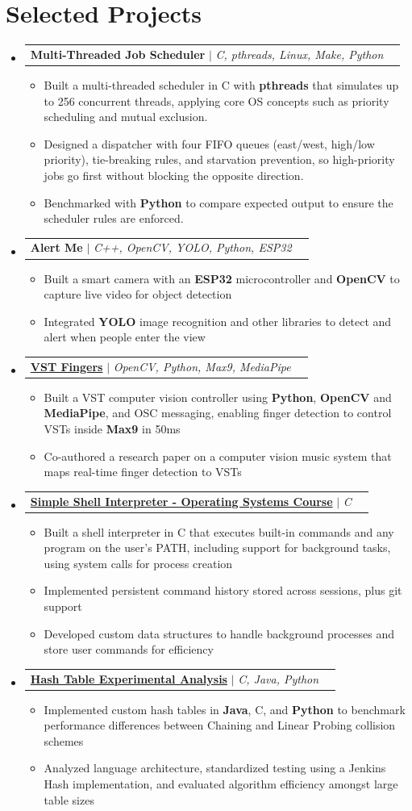 \documentclass[letterpaper,10pt]{article}
\makeatletter
\newcommand{\resumeItem}[1]{
  \item\small{
    {#1 \vspace{-1pt}}
  }
}
\newcommand{\resumeProjectHeading}[2]{
    \item
    \begin{tabularx}{0.97\textwidth}{@{}Xr@{}}
      \small#1 & #2 \\
    \end{tabularx}\vspace{-6pt}
}
\newcommand{\resumeSubHeadingListStart}{\begin{itemize}[leftmargin=0.15in, label={}]}
\newcommand{\resumeSubHeadingListEnd}{\end{itemize}}
\newcommand{\resumeItemListStart}{\begin{itemize}[label=$\bullet$, itemsep=1.80pt, topsep=0pt, parsep=0pt]}
\newcommand{\resumeItemListEnd}{\end{itemize}\vspace{-2pt}}
\makeatother
\begin{document}
\section{Selected Projects}
\resumeSubHeadingListStart
\resumeProjectHeading{\textbf{Multi-Threaded Job Scheduler} $|$ \emph{C, pthreads, Linux, Make, Python}}{}
\resumeItemListStart
  \resumeItem{Built a multi-threaded scheduler in C with \textbf{pthreads} that simulates up to 256 concurrent threads, applying core OS concepts such as priority scheduling and mutual exclusion.}
  \resumeItem{Designed a dispatcher with four FIFO queues (east/west, high/low priority), tie-breaking rules, and starvation prevention, so high-priority jobs go first without blocking the opposite direction.}
  \resumeItem{Benchmarked with \textbf{Python} to compare expected output to ensure the scheduler rules are enforced.}
\resumeItemListEnd
\resumeProjectHeading{\textbf{Alert Me} $|$ \emph{C++, OpenCV, YOLO, Python, ESP32}}{}
\resumeItemListStart
  \resumeItem{Built a smart camera with an \textbf{ESP32} microcontroller and \textbf{OpenCV} to capture live video for object detection}
  \resumeItem{Integrated \textbf{YOLO} image recognition and other libraries to detect and alert when people enter the view}
\resumeItemListEnd
\resumeProjectHeading{\href{https://github.com/samnne/vst-fingers}{\textbf{VST Fingers}} $|$ \emph{OpenCV, Python, Max9, MediaPipe}}{}
\resumeItemListStart
  \resumeItem{Built a VST computer vision controller using \textbf{Python}, \textbf{OpenCV} and \textbf{MediaPipe}, and OSC messaging, enabling finger detection to control VSTs inside \textbf{Max9} in 50ms}
  \resumeItem{Co-authored a research paper on a computer vision music system that maps real-time finger detection to VSTs}
\resumeItemListEnd
\resumeProjectHeading{\href{https://github.com/samnne/ssi}{\textbf{Simple Shell Interpreter - Operating Systems Course}} $|$ \emph{C}}{}
\resumeItemListStart
  \resumeItem{Built a shell interpreter in C that executes built-in commands and any program on the user's PATH, including support for background tasks, using system calls for process creation}
  \resumeItem{Implemented persistent command history stored across sessions, plus git support}
  \resumeItem{Developed custom data structures to handle background processes and store user commands for efficiency}
\resumeItemListEnd
\resumeProjectHeading{\href{https://github.com/samnne/chaining_or_linear_probing}{\textbf{Hash Table Experimental Analysis}} $|$ \emph{C, Java, Python}}{}
\resumeItemListStart
  \resumeItem{Implemented custom hash tables in \textbf{Java}, C, and \textbf{Python} to benchmark performance differences between Chaining and Linear Probing collision schemes}
  \resumeItem{Analyzed language architecture, standardized testing using a Jenkins Hash implementation, and evaluated algorithm efficiency amongst large table sizes}
\resumeItemListEnd
\resumeSubHeadingListEnd
\end{document}
